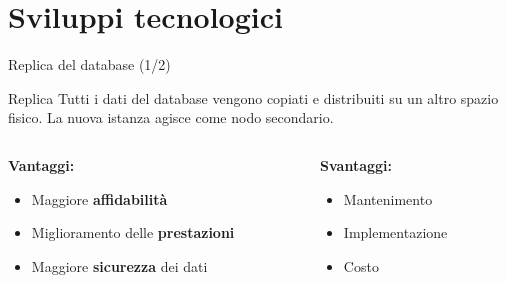 \section{Sviluppi tecnologici}
\begin{frame}{Replica del database (1/2)}
\begin{block}{Replica}
Tutti i dati del database vengono copiati e distribuiti su un altro spazio fisico. La nuova istanza agisce come nodo secondario.  
\end{block}

\vspace{0.6cm}
\begin{columns}

\begin{column}{0.6\textwidth}
\textbf{Vantaggi:}\vspace{0.1cm}
\begin{itemize}
  \item Maggiore \textbf{affidabilità}
  \item Miglioramento delle \textbf{prestazioni}
  \item Maggiore \textbf{sicurezza} dei dati
\end{itemize}
\end{column}

\begin{column}{0.4\textwidth}
\textbf{Svantaggi:}\vspace{0.1cm}
\begin{itemize}
  \item Mantenimento
  \item Implementazione
  \item Costo
\end{itemize}
\end{column}

\end{columns}

\end{frame}


